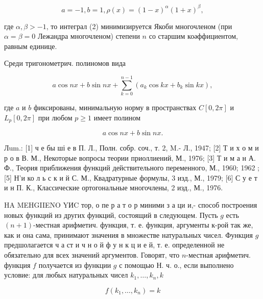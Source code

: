 \documentclass[10pt]{article}
\begin{document}
\[

a=-1, b=1, \rho(x)=(1-x)^{\alpha}(1+x)^{\beta},

\]



где $\alpha, \beta>-1$, то интеграл (2) минимизируется Якоби многочленом (при $\alpha=\beta=0$ Лежандра многочленом) степени $n$ со старшим коәффициентом, равным единице.



Среди тригонометрич. полиномов вида



\[

a \cos n x+b \sin n x+\sum_{k=0}^{n-1}\left(a_{k} \cos k x+b_{k} \sin k x\right),

\]



где $a$ и $b$ фиксированы, минимальную норму в пространствах $C[0,2 \pi]$ и $L_{p}[0,2 \pi]$ при любом $p \geqslant 1$ имеет полином



\[

a \cos n x+b \sin n x .

\]



Лum.: [1] ч е бы ші е в П. Л., Полн. собр. соч., т. 2, M.- Л., 1947; [2] Т и х о м и р о в В. М., Некоторые вопросы теории приоллиений, М., 1976; [3] Т и м а н А. Ф., Теория приближения функций действительного переменного, М., 1960; 1962 ; [5] Н'и ко л ь с к и й С. М., Квадратурные формулы, 3 изд., М., 1979; [6] С у е т и н П. К., Классические ортогональные многочлены, 2 изд., М., 1976.



HA MEHGIIENO YИC тор, о пе р а т о р миними з а ци и,- способ построения новых функций из других функций, состоящий в следующем. Пусть $g$ есть $(n+1)$-местная арифметич. функция, т. е. функция, аргументы к-рой так же, как и она сама, принимают значения в множестве натуральных чисел. Функция $g$ предшолагается ч а ст и ч н о й ф у н к ц и е й, т. е. определенной не обязательно для всех значений аргументов. Говорят, что $n$-местная арифметич. функция $f$ получается из функции $g$ с помощью Н. ч. о., если выполнено условие: для любых натуральных чисел $k_{1}, \ldots, k_{n}, k$



\[

f\left(k_{1}, \ldots, k_{n}\right)=k

\]
\end{document}
